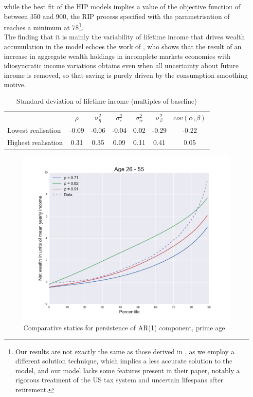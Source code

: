 while the best fit of the HIP models implies a value of the objective function
of between 350 and 900, the RIP process specified with the parametrisation of
\citet{HintermaierKoeniger2011} reaches a minimum at 78\footnote{Our results are
not exactly the same as those derived in \citet{HintermaierKoeniger2011}, as we 
employ a different solution technique, which implies a less accurate solution to 
the model, and our model lacks some features present in their paper, notably a
rigorous treatment of the US tax system and uncertain lifespans after retirement.}.\\
The finding that it is mainly the variability of lifetime income that drives
wealth accumulation in the model echoes the work of \citet{Floden2008}, who 
shows that the \citet{Aiyagari1994} result of an increase in aggregate wealth 
holdings in incomplete markets economies with idiosyncratic income variations
obtains even when all uncertainty about future income is removed, so that 
saving is purely driven by the consumption smoothing motive. 

\begin{table}%
\begin{tabular}{|l|cccccc}
                    & $\rho$ & $\sigma^2_{\eta}$ & $\sigma^2_{\varepsilon}$ & $\sigma^2_{\alpha}$ & $\sigma^2_{\beta}$ & $cov(\alpha,\beta)$ \\
Lowest realisation  & -0.09   &   -0.06           &   -0.04                  &     0.02            &     -0.29          &    -0.22   \\
Highest realisation &  0.31   &    0.35           &    0.09                  &     0.11            &      0.41          &     0.05   \\
\end{tabular}
\caption{Standard deviation of lifetime income (multiples of baseline)}
\label{tab:lifetime_dispersion}
\end{table}


\begin{figure}
\includegraphics[width=\columnwidth]{comp_stat_rho}
\caption{Comparative statics for persistence of AR(1) component, prime age}
\label{fig:comp_stat_rho}
\end{figure}

